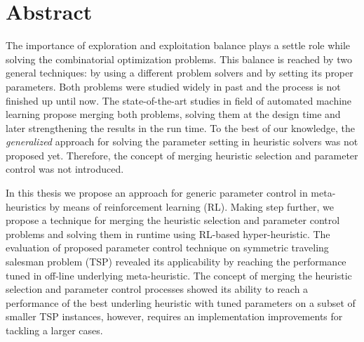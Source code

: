 \newpage
\section*{Abstract}
The importance of exploration and exploitation balance plays a settle role while solving the combinatorial optimization problems. This balance is reached by two general techniques: by using a different problem solvers and by setting its proper parameters. Both problems were studied widely in past and the process is not finished up until now. The state-of-the-art studies in field of automated machine learning propose merging both problems, solving them at the design time and later strengthening the results in the run time. To the best of our knowledge, the \emph{generalized} approach for solving the parameter setting in heuristic solvers was not proposed yet. Therefore, the concept of merging heuristic selection and parameter control was not introduced.

In this thesis we propose an approach for generic parameter control in meta-heuristics by means of reinforcement learning (RL). Making step further, we propose a technique for merging the heuristic selection and parameter control problems and solving them in runtime using RL-based hyper-heuristic. The evaluation of proposed parameter control technique on symmetric traveling salesman problem (TSP) revealed its applicability by reaching the performance tuned in off-line underlying meta-heuristic. The concept of merging the heuristic selection and parameter control processes showed its ability to reach a performance of the best underling heuristic with tuned parameters on a subset of smaller TSP instances, however, requires an implementation improvements for tackling a larger cases.